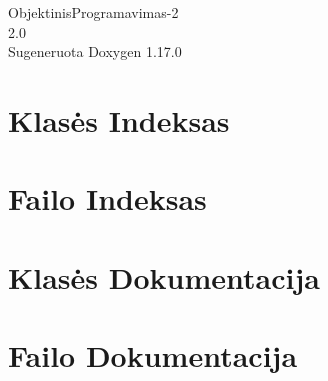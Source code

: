 \documentclass[twoside]{book}
\newcommand{\+}{\discretionary{\mbox{\scriptsize$\hookleftarrow$}}{}{}}
\newcommand{\clearemptydoublepage}{%
    \newpage{\pagestyle{empty}\cleardoublepage}%
  }
\begin{document}
  \raggedbottom
    \hypersetup{pageanchor=false,
                bookmarksnumbered=true,
                pdfencoding=unicode
               }
  \begin{titlepage}
  \vspace*{7cm}
  \begin{center}%
  {\Large Objektinis\+Programavimas-\/2}\\
  [1ex]\large 2.\+0 \\
  \vspace*{1cm}
  {\large Sugeneruota Doxygen 1.17.0}\\
  \end{center}
  \end{titlepage}
  \clearemptydoublepage
  \tableofcontents
  \clearemptydoublepage
  \hypersetup{pageanchor=true}
\chapter{Klasės Indeksas}

\chapter{Failo Indeksas}

\chapter{Klasės Dokumentacija}


\chapter{Failo Dokumentacija}






















  \backmatter
  \newpage
  \clearemptydoublepage
  \printindex
\end{document}
